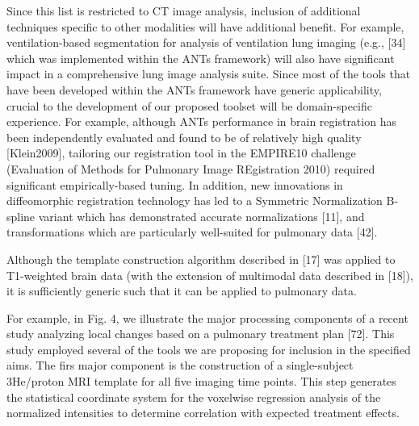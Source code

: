 \documentclass[11pt,]{article}
\begin{document}
Since this list is restricted to CT image analysis, inclusion of
additional techniques specific to other modalities will have additional
benefit. For example, ventilation-based segmentation for analysis of
ventilation lung imaging (e.g., {[}34{]} which was implemented within
the ANTs framework) will also have significant impact in a comprehensive
lung image analysis suite. Since most of the tools that have been
developed within the ANTs framework have generic applicability, crucial
to the development of our proposed toolset will be domain-specific
experience. For example, although ANTs performance in brain registration
has been independently evaluated and found to be of relatively high
quality {[}Klein2009{]}, tailoring our registration tool in the EMPIRE10
challenge (Evaluation of Methods for Pulmonary Image REgistration 2010)
required significant empirically-based tuning. In addition, new
innovations in diffeomorphic registration technology has led to a
Symmetric Normalization B-spline variant which has demonstrated accurate
normalizations {[}11{]}, and transformations which are particularly
well-suited for pulmonary data {[}42{]}.

Although the template construction algorithm described in {[}17{]} was
applied to T1-weighted brain data (with the extension of multimodal data
described in {[}18{]}), it is sufficiently generic such that it can be
applied to pulmonary data.

For example, in Fig. 4, we illustrate the major processing components of
a recent study analyzing local changes based on a pulmonary treatment
plan {[}72{]}. This study employed several of the tools we are proposing
for inclusion in the specified aims. The firs major component is the
construction of a single-subject 3He/proton MRI template for all five
imaging time points. This step generates the statistical coordinate
system for the voxelwise regression analysis of the normalized
intensities to determine correlation with expected treatment effects.
\end{document}
